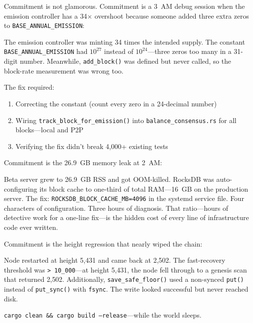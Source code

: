 \documentclass[11pt,a4paper]{article}
\begin{document}
\vspace{0.3cm}

Commitment is not glamorous. Commitment is a 3~AM debug session when
the emission controller has a 34$\times$ overshoot because someone
added three extra zeros to \texttt{BASE\_ANNUAL\_EMISSION}:

\begin{codestory}[title={\textbf{The 34$\times$ Emission Overshoot (Feb 9, 2026)}}]
\small
The emission controller was minting 34 times the intended supply.
The constant \texttt{BASE\_ANNUAL\_EMISSION} had $10^{27}$ instead of
$10^{24}$---three zeros too many in a 31-digit number. Meanwhile,
\texttt{add\_block()} was defined but never called, so the block-rate
measurement was wrong too.

The fix required:
\begin{enumerate}[leftmargin=2em]
    \item Correcting the constant (count every zero in a 24-decimal number)
    \item Wiring \texttt{track\_block\_for\_emission()} into
          \texttt{balance\_consensus.rs} for all blocks---local and P2P
    \item Verifying the fix didn't break 4{,}000+ existing tests
\end{enumerate}
\end{codestory}

\vspace{0.3cm}

Commitment is the 26.9~GB memory leak at 2~AM:

\begin{codestory}[title={\textbf{The RocksDB Memory Leak (Feb 19, 2026)}}]
\small
Beta server grew to 26.9~GB RSS and got OOM-killed. RocksDB was
auto-configuring its block cache to one-third of total RAM---16~GB
on the production server. The fix:
\texttt{ROCKSDB\_BLOCK\_CACHE\_MB=4096} in the systemd service file.
Four characters of configuration. Three hours of diagnosis.
That ratio---hours of detective work for a one-line fix---is the hidden
cost of every line of infrastructure code ever written.
\end{codestory}

\vspace{0.3cm}

Commitment is the height regression that nearly wiped the chain:

\begin{codestory}[title={\textbf{The Height Regression (Feb 19, 2026)}}]
\small
Node restarted at height 5{,}431 and came back at 2{,}502. The
fast-recovery threshold was \texttt{> 10\_000}---at height 5{,}431, the
node fell through to a genesis scan that returned 2{,}502. Additionally,
\texttt{save\_safe\_floor()} used a non-synced \texttt{put()} instead of
\texttt{put\_sync()} with \texttt{fsync}. The write looked successful but
never reached disk.

\texttt{cargo clean \&\& cargo build --release}---while the world sleeps.
\end{codestory}
\end{document}
